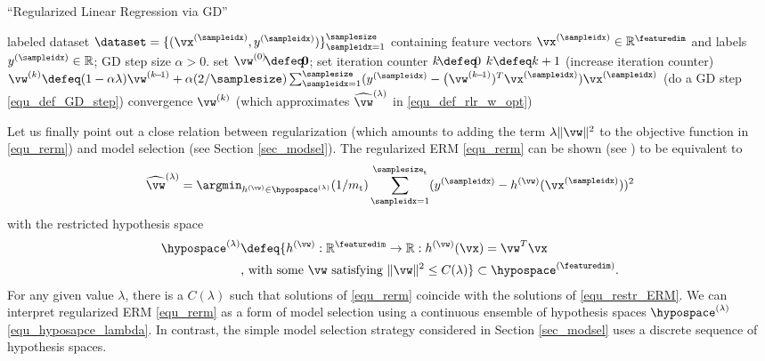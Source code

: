\documentclass[12pt]{report}
\begin{document}
\begin{algorithm}[htbp]
\caption{``Regularized Linear Regression via GD''}\label{alg:gd_reglinreg}
\begin{algorithmic}[1]
\renewcommand{\algorithmicrequire}{\textbf{Input:}}
\renewcommand{\algorithmicensure}{\textbf{Output:}}
\Require   labeled dataset $\dataset=\{ (\vx^{(\sampleidx)}, y^{(\sampleidx)}) \}_{\sampleidx=1}^{\samplesize}$ containing feature vectors 
$\vx^{(\sampleidx)} \in \mathbb{R}^{\featuredim}$ and labels $y^{(\sampleidx)} \in \mathbb{R}$; GD step size $\alpha >0$. 
\Statex\hspace{-6mm}{\bf Initialize:}set $\vw^{(0)}\!\defeq\!\mathbf{0}$; set iteration counter $k\!\defeq\!0$   
\Repeat 
\State $k \defeq k +1$    (increase iteration counter) 
\State  $\vw^{(k)} \defeq (1- \alpha \lambda) \vw^{(k\!-\!1)} + \alpha (2/\samplesize) \sum_{\sampleidx=1}^{\samplesize} (y^{(\sampleidx)} - \big(\vw^{(k\!-\!1)})^{T} \vx^{(\sampleidx)}) \vx^{(\sampleidx)}$  (do a GD step \eqref{equ_def_GD_step})
\Until convergence 
\Ensure $\vw^{(k)}$ (which approximates $\widehat{\vw}^{(\lambda)}$ in \eqref{equ_def_rlr_w_opt})
\end{algorithmic}
\end{algorithm}

Let us finally point out a close relation between regularization (which amounts to 
adding the term $\lambda \| \vw \|^{2}$ to the objective function in \eqref{equ_rerm}) 
and model selection (see Section \ref{sec_modsel}). The regularized ERM \eqref{equ_rerm} 
can be shown (see \cite[Ch. 5]{BertsekasNonLinProgr}) to be equivalent to 
\begin{equation} 
\label{equ_restr_ERM}
\widehat{\vw}^{(\lambda)} = \argmin_{h^{(\vw)} \in \hypospace^{(\lambda)}}  (1/m_{\rm t}) \sum_{\sampleidx=1}^{\samplesize_{\rm t}}  (y^{(\sampleidx)} - h^{(\vw)}(\vx^{(\sampleidx)})  )^2
\end{equation}  
with the restricted hypothesis space
\begin{align} 
\label{equ_hyposapce_lambda}
\hypospace^{(\lambda)} & \defeq \{ h^{(\vw)}: \mathbb{R}^{\featuredim} \rightarrow \mathbb{R}: h^{(\vw)}(\vx) = \vw^{T} \vx \nonumber \\
& \mbox{, with some } \vw \mbox{ satisfying } \| \vw \|^{2} \leq C(\lambda) \} \subset \hypospace^{(\featuredim)}. 
\end{align} 
For any given value $\lambda$, there is a $C(\lambda)$ such that 
solutions of \eqref{equ_rerm} coincide with the solutions of \eqref{equ_restr_ERM}. 
We can interpret regularized ERM \eqref{equ_rerm} as a form of model selection using 
a continuous ensemble of hypothesis spaces $\hypospace^{(\lambda)}$ \eqref{equ_hyposapce_lambda}. 
In contrast, the simple model selection strategy considered in Section \ref{sec_modsel} 
uses a discrete sequence of hypothesis spaces.   
\end{document}
